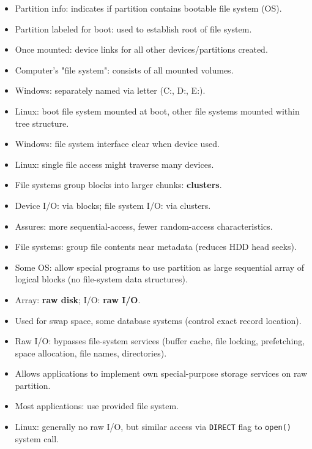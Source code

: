 \begin{itemize}
\begin{itemize}
    \end{itemize}
    \item Partition info: indicates if partition contains bootable file system (OS).
    \item Partition labeled for boot: used to establish root of file system.
    \item Once mounted: device links for all other devices/partitions created.
    \item Computer's "file system": consists of all mounted volumes.
    \item Windows: separately named via letter (C:, D:, E:).
    \item Linux: boot file system mounted at boot, other file systems mounted within tree structure.
    \item Windows: file system interface clear when device used.
    \item Linux: single file access might traverse many devices.
    \item File systems group blocks into larger chunks: \textbf{clusters}.
    \item Device I/O: via blocks; file system I/O: via clusters.
    \item Assures: more sequential-access, fewer random-access characteristics.
    \item File systems: group file contents near metadata (reduces HDD head seeks).
    \item Some OS: allow special programs to use partition as large sequential array of logical blocks (no file-system data structures).
    \item Array: \textbf{raw disk}; I/O: \textbf{raw I/O}.
    \item Used for swap space, some database systems (control exact record location).
    \item Raw I/O: bypasses file-system services (buffer cache, file locking, prefetching, space allocation, file names, directories).
    \item Allows applications to implement own special-purpose storage services on raw partition.
    \item Most applications: use provided file system.
    \item Linux: generally no raw I/O, but similar access via \texttt{DIRECT} flag to \texttt{open()} system call.
\end{itemize}

